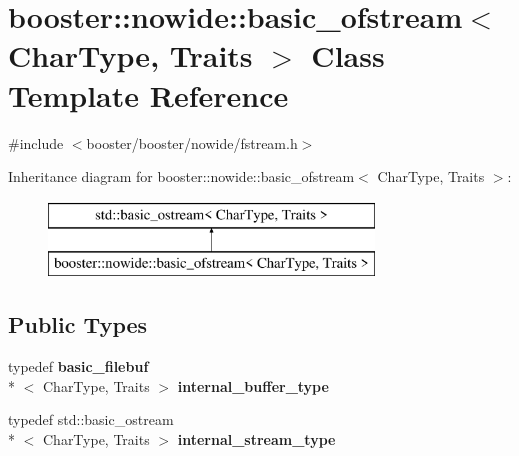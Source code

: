 \section{booster\-:\-:nowide\-:\-:basic\-\_\-ofstream$<$ Char\-Type, Traits $>$ Class Template Reference}
\label{classbooster_1_1nowide_1_1basic__ofstream}


{\ttfamily \#include $<$booster/booster/nowide/fstream.\-h$>$}

Inheritance diagram for booster\-:\-:nowide\-:\-:basic\-\_\-ofstream$<$ Char\-Type, Traits $>$\-:\begin{figure}[H]
\begin{center}
\leavevmode
\includegraphics[height=2.000000cm]{classbooster_1_1nowide_1_1basic__ofstream}
\end{center}
\end{figure}
\subsection*{Public Types}
\begin{DoxyCompactItemize}
\item 
typedef {\bf basic\-\_\-filebuf}\\*
$<$ Char\-Type, Traits $>$ {\bfseries internal\-\_\-buffer\-\_\-type}\label{classbooster_1_1nowide_1_1basic__ofstream_abb81c9368f20f17ace9841b4153723c8}

\item 
typedef std\-::basic\-\_\-ostream\\*
$<$ Char\-Type, Traits $>$ {\bfseries internal\-\_\-stream\-\_\-type}\label{classbooster_1_1nowide_1_1basic__ofstream_a4cf9219d4d52d5598ad7cf55c225d153}

\end{DoxyCompactItemize}
